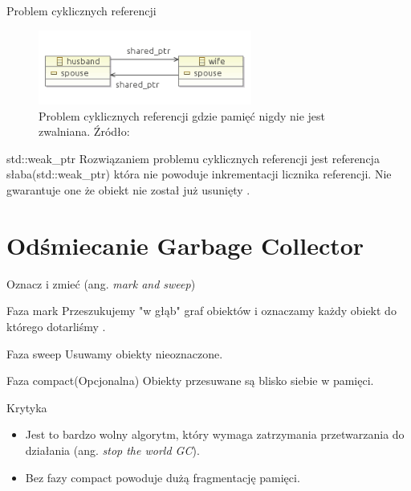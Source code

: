 \documentclass[xcolor=table]{beamer}
\begin{document}
\begin{frame}{Problem cyklicznych referencji}
    \begin{figure}
        \centering
        \includegraphics[width=7cm]{cyclic_ref.png}
        \caption{Problem cyklicznych referencji gdzie pamięć nigdy nie jest zwalniana. Źródło: \cite{weak-ptr-vs-magazine}}
        \label{fig:enter-label}
    \end{figure} 

\begin{block}{std::weak\_ptr}
    Rozwiązaniem problemu cyklicznych referencji jest referencja słaba(std::weak\_ptr) która nie powoduje inkrementacji licznika referencji. Nie gwarantuje one że obiekt nie został już usunięty \cite{weak-ptr-vs-magazine, cpp-weak-ptr}. 
\end{block}
\end{frame}



\section{Odśmiecanie Garbage Collector}

\begin{frame}{Oznacz i zmieć (ang. \textit{mark and sweep})}
    \begin{block}{Faza mark}
        Przeszukujemy "w głąb" graf obiektów i oznaczamy każdy obiekt do którego dotarliśmy \cite{mark-and-sweep}. 
    \end{block}
    \begin{block}{Faza sweep}
        Usuwamy obiekty nieoznaczone.
    \end{block}
        \begin{block}{Faza compact(Opcjonalna)}
        Obiekty przesuwane są blisko siebie w pamięci.
    \end{block}

    \begin{block}{Krytyka}
    \begin{itemize}
        \item Jest to bardzo wolny algorytm, który wymaga zatrzymania przetwarzania do działania (ang. \textit{stop the world GC}).
        \item  Bez fazy compact powoduje dużą fragmentację pamięci. 
    \end{itemize}
    \end{block}
\end{frame}
\end{document}
